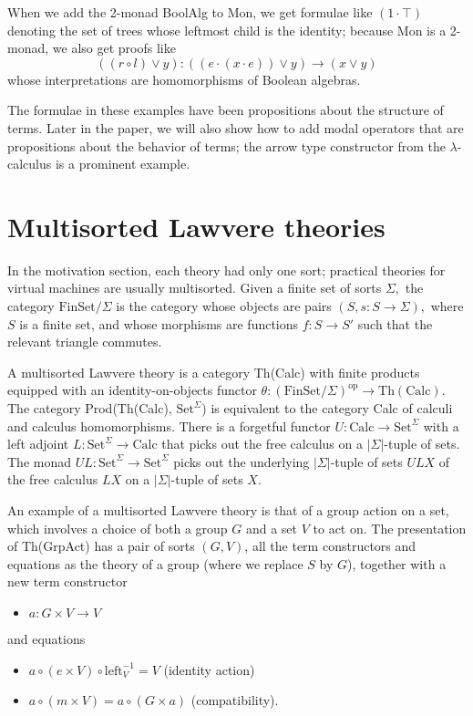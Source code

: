 \documentclass{llncs}
\newcommand{\maps}{\colon}
\newcommand{\FinSet}{\mathrm{FinSet}}
\newcommand{\Set}{\mathrm{Set}}
\newcommand{\Calc}{\mathrm{Calc}}
\newcommand{\leftu}{\mathrm{left}}
\newcommand{\op}{\mathrm{op}}
\begin{document}
When we add the 2-monad BoolAlg to Mon, we get formulae like $(1 \cdot \top)$ denoting the set of trees whose leftmost child is the identity; because Mon is a 2-monad, we also get proofs like 
\[ ((r \circ l) \lor y)\maps ((e \cdot (x \cdot e)) \lor y) \to (x \lor y) \]
whose interpretations are homomorphisms of Boolean algebras.

The formulae in these examples have been propositions about the structure of terms.  Later in the paper, we will also show how to add modal operators that are propositions about the behavior of terms; the arrow type constructor from the $\lambda$-calculus is a prominent example.

\section{Multisorted Lawvere theories}
In the motivation section, each theory had only one sort; practical theories for virtual machines are usually multisorted.  Given a finite set of sorts $\Sigma,$ the category $\FinSet/\Sigma$ is the category whose objects are pairs $(S, s\maps S\to \Sigma),$ where $S$ is a finite set, and whose morphisms are functions $f\maps S \to S'$ such that the relevant triangle commutes.

A multisorted Lawvere theory is a category Th(Calc) with finite products equipped with an identity-on-objects functor ${\theta\maps (\FinSet/\Sigma)^\op \to \mathrm{Th(Calc)}.}$  The category Prod(Th(Calc), $\Set^\Sigma$) is equivalent to the category Calc of calculi and calculus homomorphisms.  There is a forgetful functor ${U\maps \Calc \to \Set^\Sigma}$ with a left adjoint ${L\maps \Set^\Sigma \to \Calc}$ that picks out the free calculus on a $|\Sigma|$-tuple of sets.  The monad ${UL\maps \Set^\Sigma \to \Set^\Sigma}$ picks out the underlying $|\Sigma|$-tuple of sets $ULX$ of the free calculus $LX$ on a $|\Sigma|$-tuple of sets $X$.

An example of a multisorted Lawvere theory is that of a group action on a set, which involves a choice of both a group $G$ and a set $V$ to act on.  The presentation of Th(GrpAct) has a pair of sorts $(G, V)$, all the term constructors and equations as the theory of a group (where we replace $S$ by $G$), together with a new term constructor
\begin{itemize}
  \item $a\maps G \times V \to V$
\end{itemize}
and equations
\begin{itemize}
  \item $a \circ (e \times V) \circ \leftu^{-1}_V = V$ (identity action)
  \item $a \circ (m \times V) = a \circ (G \times a)$ (compatibility).
\end{itemize}
\end{document}
